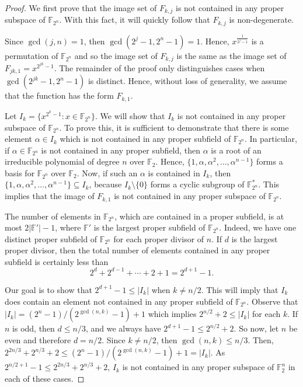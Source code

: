\documentclass[12pt]{article}
\theoremstyle{definition}
\newcommand{\F}{\mathbb F}
\newcommand{\Fpn}{\mathbb{F}_{2^n}}
\newcounter{numb}
\begin{document}
\begin{proof}
    We first prove that the image set of $F_{k, j}$ is not contained in any proper subspace of $\F_{2^n}$. With this fact, it will quickly follow that $F_{k, j}$ is non-degenerate. 
    
    
    Since $\gcd(j, n) = 1$, then $\gcd(2^j -1, 2^n - 1) = 1$. Hence, 
    $x^{\frac{1}{2^{j}-1}}$ is a permutation of $\F_{2^n}$ and so the image set of $F_{k, j}$ is the same as the image set of $F_{jk, 1} = x^{2^{jk}-1}$. The remainder of the proof only distinguishes cases when $\gcd(2^{jk}-1, 2^n -1)$ is distinct. Hence, without loss of generality, we assume that the function has the form $F_{k, 1}$.
    
     Let $I_k = \{ x^{2^{k}-1}: x \in \F_{2^n}\}$. We will show that $I_k$ is not contained in any proper subspace of $\F_{2^n}$. To prove this, it is sufficient to demonstrate that there is some element $\alpha \in I_{k}$ which is not contained in any proper subfield of $\F_{2^n}$. In particular, if $\alpha \in \F_{2^n}$ is not contained in any proper subfield, then $\alpha$ is a root of an irreducible polynomial of degree $n$ over $\F_2$. Hence, $\{ 1, \alpha, \alpha^2, \dots, \alpha^{n-1} \} $ forms a basis for $\F_{2^n}$ over $\F_2$. Now, if such an $\alpha$ is contained in $I_k$, then $\{1, \alpha, \alpha^2, \dots, \alpha^{n-1} \} \subseteq I_k$, because $I_k\setminus \{ 0 
      \}$ forms a cyclic subgroup of $\F_{2^n}^*$. This implies that the image of $F_{k, 1}$ is not contained in any proper subspace of $\F_{2^n}$.
      
    The number of elements in $\F_{2^n}$, which are contained in a proper subfield, is at most $2|\F'| -1 $, where $\F'$ is the largest proper subfield of $\Fpn$. Indeed, we have one distinct proper subfield of $\F_{2^n}$ for each proper divisor of $n$. If $d$ is the largest proper divisor, then the total number of elements contained in any proper subfield is certainly less than
    \[
        2^d + 2^{d-1} + \cdots +2 + 1 = 2^{d+1}-1.
    \]
    
    Our goal is to show that $2^{d+1}-1\leq |I_k|$ when $k \neq n/2$. This will imply that $I_k$ does contain an element not contained in any proper subfield of $\Fpn$. Observe that $|I_k| = (2^n-1)/(2^{\gcd(n,k)}-1) + 1$ which implies $2^{n/2}+2\leq |I_k|$ for each $k$.
    If $n$ is odd, then $d\le n/3$, and we always have $2^{d + 1}-1\leq 2^{n/2} +2$. 
    So now, let $n$ be even and therefore $d = n/2$. 
    Since $k \neq n/2$, then $\gcd(n, k) \leq n/3$. Then, $2^{2n/3}+2^{n/3}+2\le  (2^n-1)/(2^{\gcd(n,k)}-1) + 1=|I_k|$. As $2^{n/2+1}-1\leq 2^{2n/3}+2^{n/3}+2$, $I_k$ is not contained in any proper subspace of $\F_2^n$ in each of these cases. 
    

\end{proof}
\end{document}
